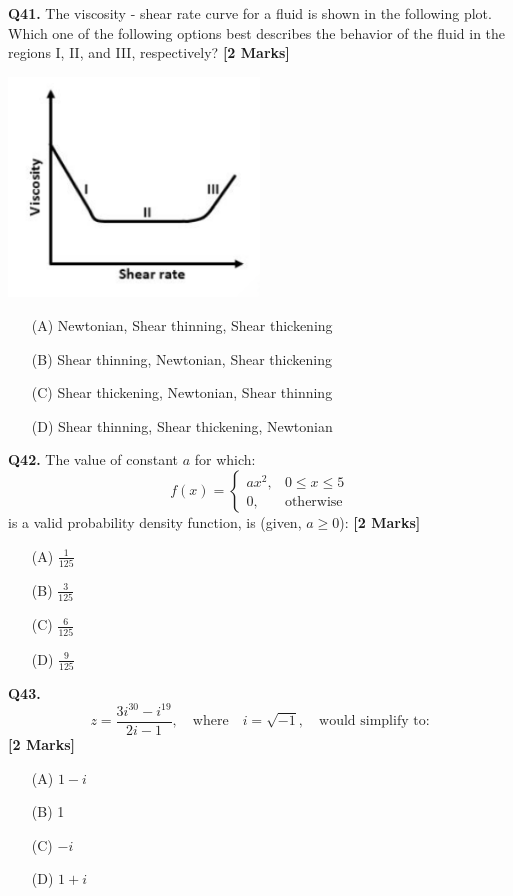 \documentclass[11pt]{article}
\newcommand{\questionb}[2]{
    \noindent\textbf{Q#2.} #1 \hfill \textbf{[2 Marks]}
}
\begin{document}
\questionb{The viscosity - shear rate curve for a fluid is shown in the following plot. Which one of the following options best describes the behavior of the fluid in the regions I, II, and III, respectively?}{41}
\begin{center}
\includegraphics[width=0.5\textwidth]{figures/41.png}
\end{center}
\begin{enumerate}
    \item[(A)] Newtonian, Shear thinning, Shear thickening
    \item[(B)] Shear thinning, Newtonian, Shear thickening
    \item[(C)] Shear thickening, Newtonian, Shear thinning
    \item[(D)] Shear thinning, Shear thickening, Newtonian
\end{enumerate}
\vspace{0.5cm}

\questionb{The value of constant \( a \) for which:
\[f(x) = 
\begin{cases} 
ax^2, & 0 \leq x \leq 5 \\ 
0, & \text{otherwise}
\end{cases}\]
is a valid probability density function, is (given, \( a \geq 0 \)):}{42}
\begin{enumerate}
    \item[(A)] \(\frac{1}{125}\)
    \item[(B)] \(\frac{3}{125}\)
    \item[(C)] \(\frac{6}{125}\)
    \item[(D)] \(\frac{9}{125}\)
\end{enumerate}
\vspace{0.5cm}

\questionb{\[z = \frac{3i^{30} - i^{19}}{2i - 1}, \quad \text{where} \quad i = \sqrt{-1}, \quad \text{would simplify to:}\]}{43}
\begin{enumerate}
    \item[(A)] \( 1 - i \)
    \item[(B)] 1
    \item[(C)] \(-i\)
    \item[(D)] \( 1 + i\)
\end{enumerate}
\vspace{0.5cm}
\end{document}
